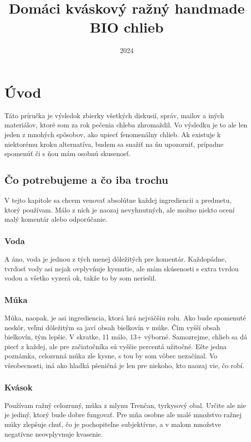 \documentclass[a4paper,12pt]{article}
\title{Domáci kváskový ražný handmade BIO chlieb}
\date{2024}
\begin{document}
\maketitle


\section{Úvod}
Táto príručka je výsledok zbierky všetkých diskusií, správ, mailov a iných materiálov, ktoré som za rok pečenia chleba zhromaždil. Vo výsledku je to ale len jeden z mnohých spôsobov, ako upiecť fenomenálny chlieb. Ak existuje k niektorému kroku alternatíva, budem sa snažiť na ňu upozorniť, prípadne spomenúť či s ňou mám osobnú skusenosť.

\subsection{Čo potrebujeme a čo iba trochu}
V tejto kapitole sa chcem venovať absolútne každej ingrediencii a predmetu, ktorý používam. Málo z nich je naozaj nevyhnutných, ale možno niekto ocení malý komentár alebo odporúčanie.
\subsubsection{Voda}
A áno, voda je jednou z tých menej dôležitých pre komentár. Každopádne, tvrdosť vody asi nejak ovplyvňuje kysnutie, ale mám skúsenosti s extra tvrdou vodou a všetko vyzerá ok, takže to by som neriešil.
\subsubsection{Múka}
Múka, naopak, je asi ingrediencia, ktorá hrá nejväčšiu rolu. Ako bude spomenuté neskôr, veľmi dôležitým sa javí obsah bielkovín v múke. Čím vyšší obsah bielkovín, tým lepšie. V skratke, 11 málo, 13+ výborné. Samozrejme, chlieb sa dá piecť z každej, ale pre začiatočníka sú vyššie percentá užitočné. Ešte jedna poznámka, celozrnná múka zle kysne, s tou by som vôbec nezačínal. Vo všeobecnosti, iná ako hladká pšeničná je len pre niekoho, kto naozaj vie, čo robí.
\subsubsection{Kvások}
Používam ražný celozrnný, múka z mlynu Trenčan, tyrkysový obal. Určite ale nie je jediný, ktorý bude dobre fungovať. Pre mňa osobne ale malé množstvo ražnej múky zlepšuje chuť, čo je pochopiteľne subjektívne, a v malom množstve negatívne neovplyvnuje kvasenie.
\end{document}
